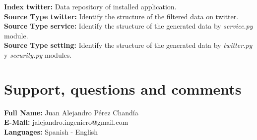 \documentclass[report]{article}
\begin{document}
\textbf{Index twitter: }Data repository of installed application.\\
\textbf{Source Type twitter: }Identify the structure of the filtered data on twitter.\\
\textbf{Source Type service: }Identify the structure of the generated data by \textit{service.py} module.\\
\textbf{Source Type setting: }Identify the structure of the generated data by \textit{twitter.py} y \textit{security.py} modules.
\newline
\section{Support, questions and comments}

\textbf{Full Name: }Juan Alejandro P\'erez Chand\'ia\\
\textbf{E-Mail: }jalejandro.ingeniero@gmail.com\\
\textbf{Languages: }Spanish - English
\end{document}
